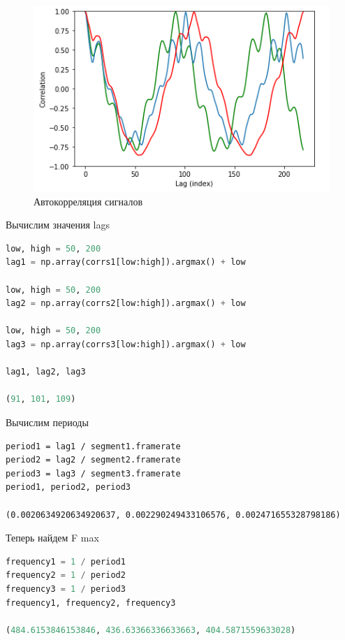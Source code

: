 \begin{figure}[H]
	\begin{center}
		\includegraphics[scale=1]{fig/lab05/lab05_02.png}
		\caption{Автокорреляция сигналов}
	\end{center}
\end{figure}

Вычислим значения lags

\begin{lstlisting}[language=Python]
low, high = 50, 200
lag1 = np.array(corrs1[low:high]).argmax() + low

low, high = 50, 200
lag2 = np.array(corrs2[low:high]).argmax() + low

low, high = 50, 200
lag3 = np.array(corrs3[low:high]).argmax() + low

lag1, lag2, lag3

(91, 101, 109)
\end{lstlisting}

Вычислим периоды

\begin{lstlisting}
period1 = lag1 / segment1.framerate
period2 = lag2 / segment2.framerate
period3 = lag3 / segment3.framerate
period1, period2, period3

(0.0020634920634920637, 0.002290249433106576, 0.002471655328798186)
\end{lstlisting}

Теперь найдем F max

\begin{lstlisting}[language=Python]
frequency1 = 1 / period1
frequency2 = 1 / period2
frequency3 = 1 / period3
frequency1, frequency2, frequency3

(484.6153846153846, 436.63366336633663, 404.5871559633028)
\end{lstlisting}



